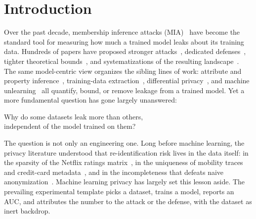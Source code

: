 \section{Introduction}
\label{sec:intro}

Over the past decade, membership inference attacks
(MIA)~\cite{homer2008resolving,shokri2017membership} have become the
standard tool for measuring how much a trained model leaks about its
training data. Hundreds of papers have proposed stronger
attacks~\cite{salem2019ml,nasr2019comprehensive,choquette2021label,song2021systematic,carlini2022lira,ye2022enhanced,watson2022importance,zarifzadeh2024rmia},
dedicated defenses~\cite{nasr2018machine,jia2019memguard,abadi2016deep},
tighter theoretical
bounds~\cite{yeom2018privacy,sablayrolles2019whitebox}, and
systematizations of the resulting
landscape~\cite{papernot2018sok,hu2022membership}. The same
model-centric view organizes the sibling lines of work: attribute and
property inference~\cite{fredrikson2015model,ganju2018property},
training-data
extraction~\cite{carlini2019secret,carlini2021extracting}, differential
privacy~\cite{dwork2006calibrating,abadi2016deep}, and machine
unlearning~\cite{cao2015towards,bourtoule2021machine,chen2021unlearning}
all quantify, bound, or remove leakage from a trained model. Yet a more
fundamental question has gone largely unanswered:

\smallskip
\begin{center}
Why do some datasets leak more than others,\\
independent of the model trained on them?
\end{center}
\smallskip

The question is not only an engineering one. Long before machine
learning, the privacy literature understood that re-identification risk
lives in the data itself: in the sparsity of the Netflix ratings
matrix~\cite{narayanan2008robust}, in the uniqueness of mobility
traces~\cite{demontjoye2013unique} and credit-card
metadata~\cite{demontjoye2015unique}, and in the incompleteness that
defeats naive anonymization~\cite{sweeney2002k,rocher2019estimating}.
Machine learning privacy has largely set this lesson aside. The
prevailing experimental template picks a dataset, trains a model,
reports an AUC, and attributes the number to the attack or the defense,
with the dataset as inert backdrop.

